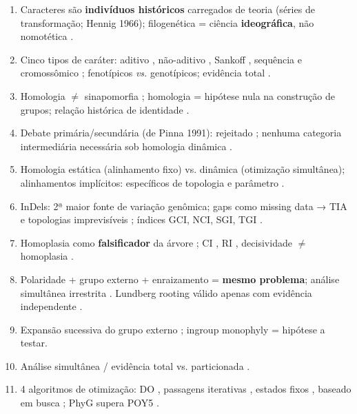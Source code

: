 \clearpage
\begin{revise}\small
\begin{enumerate}[itemsep=0pt, topsep=0pt, parsep=0pt]
    \item Caracteres são \textbf{indivíduos históricos} carregados de teoria (séries de transformação; Hennig 1966); filogenética = ciência \textbf{ideográfica}, não nomotética \parencite{grant2004ts,popper1959}.
    \item Cinco tipos de caráter: aditivo \parencite{farris1970}, não-aditivo \parencite{fitch1971}, Sankoff \parencite{sankoff1975}, sequência e cromossômico \parencite{wheeleretal2006}; fenotípicos \textit{vs.} genotípicos; evidência total \parencite{kluge1989}.
    \item Homologia $\neq$ sinapomorfia \parencite{nixon2012}; homologia = hipótese nula na construção de grupos; relação histórica de identidade \parencite{grant2004ts}.
    \item Debate primária/secundária (de Pinna 1991): rejeitado \parencite{wheeleretal2006,grant2004ts}; nenhuma categoria intermediária necessária sob homologia dinâmica \parencite{wheeler2001a,wheeler2001b}.
    \item Homologia estática (alinhamento fixo) vs. dinâmica (otimização simultânea); alinhamentos implícitos: específicos de topologia e parâmetro \parencite{wheeler2003a}.
    \item InDels: 2ª maior fonte de variação genômica; gaps como missing data → TIA e topologias imprevisíveis \parencite{jacobmachado2021c}; índices GCI, NCI, SGI, TGI \parencite{jacobmachado2021c}.
    \item Homoplasia como \textbf{falsificador} da árvore \parencite{farris1983,kluge2009}; CI \parencite{klugeanfarris1969}, RI \parencite{farris1989}, decisividade $\neq$ homoplasia \parencite{goloboff1991}.
    \item Polaridade + grupo externo + enraizamento = \textbf{mesmo problema}; análise simultânea irrestrita \parencite{nixon1993}. Lundberg rooting válido apenas com evidência independente \parencite{nixon1993}.
    \item Expansão sucessiva do grupo externo \parencite{grant2019}; ingroup monophyly = hipótese a testar.
    \item Análise simultânea / evidência total \parencite{kluge1989,nixon1996} vs. particionada \parencite{grantkluge2003}.
    \item 4 algoritmos de otimização: DO \parencite{wheeler1996}, passagens iterativas \parencite{wheeler2003b}, estados fixos \parencite{wheeler1999a}, baseado em busca \parencite{wheeler2003c}; PhyG supera POY5 \parencite{wheeleretal2024,varonwheeler2012}.

\end{enumerate}
\end{revise}

